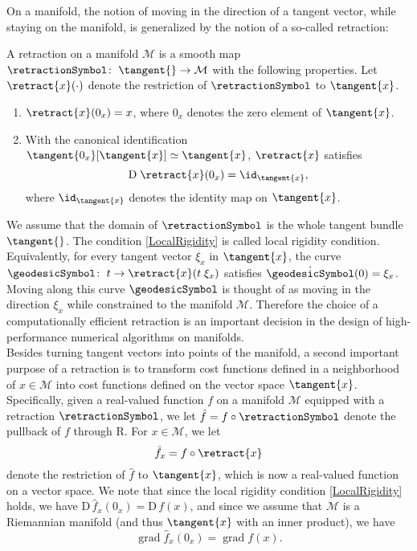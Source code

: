 On a manifold, the notion of moving in the direction of a tangent vector, while staying on the manifold, is generalized by the notion of a so-called retraction:
\begin{definition}\label{Retraction}
    A retraction on a manifold $\mathcal{M}$ is a smooth map $\retractionSymbol \colon \; \tangent{} \to \mathcal{M}$ with the following properties. Let $\retract{x}(\cdot)$ denote the restriction of $\retractionSymbol$ to $\tangent{x}$. 
    \begin{enumerate}
        \item $\retract{x}(0_x) = x$, where $0_x$ denotes the zero element of $\tangent{x}$. 
        \item With the canonical identification $\tangent{0_x}[\tangent{x}] \simeq \tangent{x}$, $\retract{x}$ satisfies \begin{equation} \mathrm{D} \; \retract{x}(0_x) = \id_{\tangent{x}}, \label{LocalRigidity} \end{equation} where $\id_{\tangent{x}}$ denotes the identity map on $\tangent{x}$.  
    \end{enumerate}
\end{definition}
We assume that the domain of $\retractionSymbol$ is the whole tangent bundle $\tangent{}$. The condition \cref{LocalRigidity} is called local rigidity condition. Equivalently, for every tangent vector $\xi_x$ in $\tangent{x}$, the curve $\geodesicSymbol \colon \; t \to \retract{x}(t \; \xi_x)$ satisfies $\dot{\geodesicSymbol}(0) = \xi_x$. Moving along this curve $\geodesicSymbol$ is thought of as moving in the direction $\xi_x$ while constrained to the manifold $\mathcal{M}$. Therefore the choice of a computationally efficient retraction is an important decision in the design of high-performance numerical algorithms on manifolds. \\
Besides turning tangent vectors into points of the manifold, a second important purpose of a retraction is to transform cost functions defined in a neighborhood of $x \in \mathcal{M}$ into cost functions defined on the vector space $\tangent{x}$. Specifically, given a real-valued function $f$ on a manifold $\mathcal{M}$ equipped with a retraction $\retractionSymbol$, we let $\hat{f} = f \circ \retractionSymbol$ denote the pullback of $f$ through R. For $x \in \mathcal{M}$, we let
\begin{equation}\label{pullback}
    \hat{f}_x = f \circ \retract{x}
\end{equation}
denote the restriction of $\hat{f}$ to $\tangent{x}$, which is now a real-valued function on a vector space. We note that since the local rigidity condition \cref{LocalRigidity} holds, we have $\mathrm{D} \, \hat{f}_x (0_x) = \mathrm{D} \, f(x)$, and since we assume that $\mathcal{M}$ is a Riemannian manifold (and thus $\tangent{x}$ with an inner product), we have 
\begin{equation*}
    \operatorname{grad} \hat{f}_x (0_x) = \operatorname{grad} f(x).
\end{equation*}
\cite[p.~54-56]{AbsilMahonySepulchre:2008}
